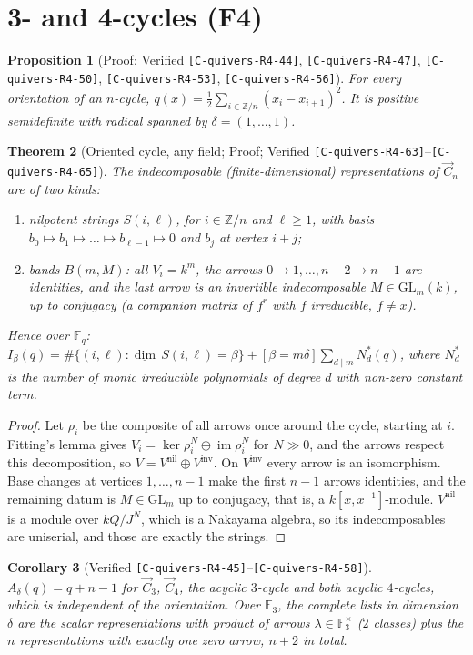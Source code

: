 \documentclass[11pt]{article}
\newtheorem{theorem}{Theorem}\newtheorem{proposition}[theorem]{Proposition}\newtheorem{corollary}[theorem]{Corollary}
\theoremstyle{definition}\newtheorem{definition}[theorem]{Definition}\newtheorem{remark}[theorem]{Remark}\newtheorem{observation}[theorem]{Numerical observation}
\newcommand{\C}[1]{\texttt{[C-#1]}}
\begin{document}
\section{3- and 4-cycles (F4)}
\begin{proposition}[Proof; Verified \C{quivers-R4-44}, \C{quivers-R4-47}, \C{quivers-R4-50}, \C{quivers-R4-53}, \C{quivers-R4-56}]
For every orientation of an $n$-cycle, $q(x)=\tfrac12\sum_{i\in\mathbb Z/n}(x_i-x_{i+1})^2$. It is positive semidefinite with radical spanned by $\delta=(1,\dots,1)$.
\end{proposition}
\begin{theorem}[Oriented cycle, any field; Proof; Verified \C{quivers-R4-63}--\C{quivers-R4-65}]\label{thm:cycle}
The indecomposable (finite-dimensional) representations of $\vec C_n$ are of two kinds:
\begin{enumerate}
\item \emph{nilpotent strings} $S(i,\ell)$, for $i\in\mathbb Z/n$ and $\ell\ge1$, with basis $b_0\mapsto b_1\mapsto\dots\mapsto b_{\ell-1}\mapsto0$ and $b_j$ at vertex $i+j$;
\item \emph{bands} $B(m,M)$: all $V_i=k^m$, the arrows $0\to1,\dots,n-2\to n-1$ are identities, and the last arrow is an invertible indecomposable
$M\in\mathrm{GL}_m(k)$, up to conjugacy (a companion matrix of $f^r$ with $f$ irreducible, $f\neq x$).
\end{enumerate}
Hence over $\mathbb F_q$: $I_\beta(q)=\#\{(i,\ell):\underline{\dim}\,S(i,\ell)=\beta\}+[\beta=m\delta]\sum_{d\mid m}N^*_d(q)$, where $N^*_d$ is the number of
monic irreducible polynomials of degree $d$ with non-zero constant term.
\end{theorem}
\begin{proof}
Let $\rho_i$ be the composite of all arrows once around the cycle, starting at $i$. Fitting's lemma gives $V_i=\ker\rho_i^N\oplus\operatorname{im}\rho_i^N$
for $N\gg0$, and the arrows respect this decomposition, so $V=V^{\mathrm{nil}}\oplus V^{\mathrm{inv}}$. On $V^{\mathrm{inv}}$ every arrow is an isomorphism.
Base changes at vertices $1,\dots,n-1$ make the first $n-1$ arrows identities, and the remaining datum is $M\in\mathrm{GL}_m$ up to conjugacy,
that is, a $k[x,x^{-1}]$-module. $V^{\mathrm{nil}}$ is a module over $kQ/J^N$, which is a Nakayama algebra, so its indecomposables are uniserial,
and those are exactly the strings.
\end{proof}
\begin{corollary}[Verified \C{quivers-R4-45}--\C{quivers-R4-58}]
$A_\delta(q)=q+n-1$ for $\vec C_3$, $\vec C_4$, the acyclic $3$-cycle and both acyclic $4$-cycles, which is independent of the orientation. Over $\mathbb F_3$, the complete
lists in dimension $\delta$ are the scalar representations with product of arrows $\lambda\in\mathbb F_3^\times$ ($2$ classes) plus the $n$ representations with exactly one zero
arrow, $n+2$ in total.
\end{corollary}
\end{document}
